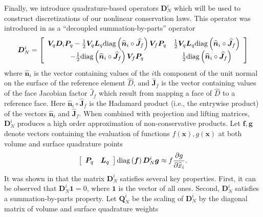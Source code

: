 \documentclass[10pt]{amsart}
\theoremstyle{definition}
\theoremstyle{lemma}
\theoremstyle{theorem}
\theoremstyle{assumption}
\renewcommand{\hat}{\widehat}
\newcommand{\pd}[2]{\frac{\partial#1}{\partial#2}}
\newcommand{\LRp}[1]{\left( #1 \right)}
\newcommand{\LRs}[1]{\left[ #1 \right]}
\newcommand{\lcwnote}[1]{{\color{magenta}{#1}}}
\newcommand{\diag}[1]{{\rm diag}\LRp{#1}}
\begin{document}
{Finally, we introduce quadrature-based operators $\bm{D}_N^i$ which will be used to construct discretizations of our nonlinear conservation laws.  This operator was introduced in \cite{chan2017discretely} as a ``decoupled summation-by-parts'' operator
\begin{equation}
\bm{D}_N^i =\LRs{
\begin{array}{cc}
\bm{V}_q\bm{D}_i \bm{P}_q - \frac{1}{2}\bm{V}_q\bm{L}_q \diag{\hat{\bm{n}}_i\circ\bm{\hat{J}}_f}\bm{V}_f\bm{P}_q & \frac{1}{2}\bm{V}_q\bm{L}_q  \diag{\hat{\bm{n}}_i\circ\bm{\hat{J}}_f}\\
- \frac{1}{2}\diag{\hat{\bm{n}}_i\circ\bm{\hat{J}}_f} \bm{V}_f\bm{P}_q &  \frac{1}{2}\diag{\hat{\bm{n}}_i\circ\bm{\hat{J}}_f}
\end{array}
}
\label{eq:decoupledsbp}
\end{equation}
where $\hat{\bm{n}}_i$ is the vector containing values of the $i$th component of the unit normal on the surface of the reference element $\hat{D}$, and $\bm{\hat{J}}_f$ is the vector containing values of the face Jacobian factor $\hat{J}_f$ which result from mapping a face of $\hat{D}$ to a reference face.  Here $\hat{\bm{n}}_i\circ\bm{\hat{J}}_f$ is the Hadamard product (i.e., the entrywise product) of the vectors $\hat{\bm{n}}_i$ and $\bm{\hat{J}}_f$.  When combined with projection and lifting matrices, $\bm{D}_N^i$ produces a high order approximation of non-conservative products.  Let $\bm{f},\bm{g}$ denote vectors containing the evaluation of functions $f(\bm{x}),g(\bm{x})$ at both volume and surface quadrature points
\[
\LRs{\begin{array}{cc}\bm{P}_q & \bm{L}_q\end{array}} \diag{\bm{f}}\bm{D}_N^i \bm{g} \approx f\pd{g}{\hat{x}_i}.
\]
It was shown in \cite{chan2017discretely} that the matrix $\bm{D}_N^i$ satisfies several key properties.  First, it can be observed that $\bm{D}_N^i\bm{1} = 0$, where $\bm{1}$ is the vector of all ones.  Second, $\bm{D}_N^i$ satisfies a summation-by-parts property.  Let $\bm{Q}_N^i$ be the scaling of $\bm{D}_N^i$ by the diagonal matrix of volume and surface quadrature weights 
}
\end{document}
